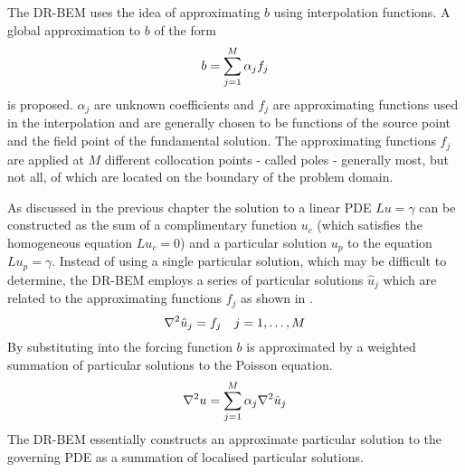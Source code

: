 The DR-BEM uses the idea of approximating $b$ using
interpolation functions.  A global approximation to $b$ of the form
\label{page:alpha}
\begin{equation}
  b =  \displaystyle\sum_{j=1}^{M}  \alpha_{j}f_{j}
\label{eq:globalapprox}
\end{equation}
is proposed.  $\alpha_{j}$ are unknown coefficients and $f_{j}$ are
approximating functions used in the interpolation and are generally chosen
to be functions of the source point and the field point of the fundamental
solution. The approximating functions $f_{j}$ are applied at $M$ different
collocation points - called poles - generally most, but not all, of which
are located on the boundary of the problem domain.

As discussed in the previous chapter the solution to a linear PDE $Lu =
\gamma$ can be constructed as the sum of a complimentary function $u_{c}$
(which satisfies the homogeneous equation $Lu_{c} = 0$) and a particular
solution $u_{p}$ to the equation $Lu_{p} = \gamma$.  Instead of using a
single particular solution, which may be difficult to determine, the DR-BEM
employs a series of particular solutions $\hat{u}_{j}$ which are related to
the approximating functions $f_{j}$ as shown in .
\begin{equation}
  \nabla^{2} {\hat{u}_{j}} = f_{j} \quad j = 1, \ldots ,M
\label{eq:harmonic}
\end{equation}
By substituting  into 
the forcing function $b$ is approximated by a weighted summation of
particular solutions to the Poisson equation.
\begin{equation}
  \nabla^{2} {u} =  \displaystyle\sum_{j=1}^{M}  \alpha_{j} \nabla^{2} {\hat{u}_{j}}
\label{eq:rhsapprox}
\end{equation}
The DR-BEM essentially constructs an approximate particular solution to the
governing PDE as a summation of localised particular solutions.  

